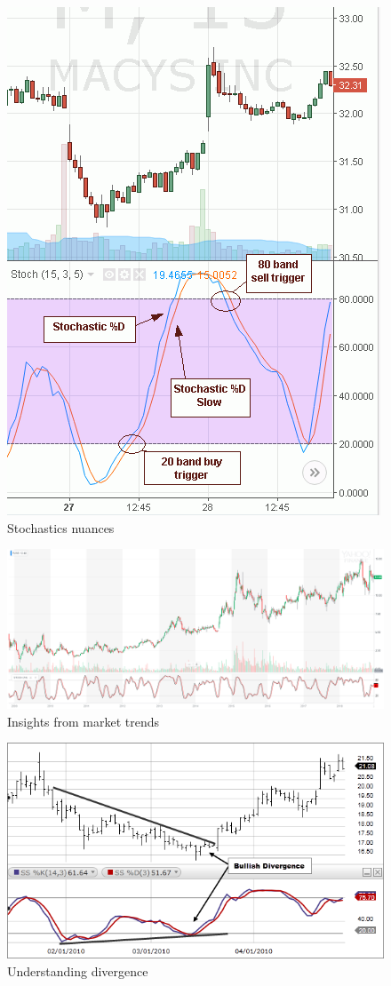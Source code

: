 \documentclass{article}
\begin{document}
\vspace{10pt}

\begin{figure}[!htb]
    \centering
    \includegraphics[width=.5\textwidth]{imgs/81.png}
    \caption{Stochastics nuances}
\end{figure}

\vspace{10pt}

\begin{figure}[!htb]
    \centering
    \includegraphics[width=\textwidth]{imgs/82.png}
    \caption{Insights from market trends}
\end{figure}

\vspace{10pt}

\begin{figure}[!htb]
    \centering
    \includegraphics[width=\textwidth]{imgs/83.png}
    \caption{Understanding divergence}
\end{figure}
\end{document}
